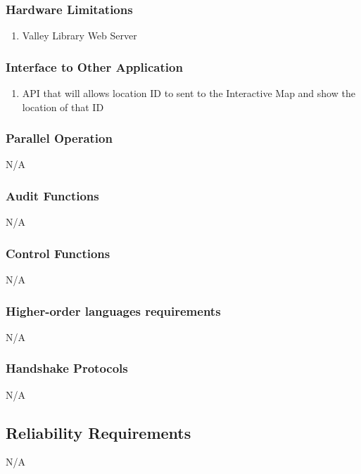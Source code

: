 \documentclass[letterpaper,10pt,titlepage]{article}
\begin{document}
\subsubsection{Hardware Limitations}
\begin{enumerate}
	\item Valley Library Web Server
\end{enumerate}

\subsubsection{Interface to Other Application}
\begin{enumerate}
	\item API that will allows location ID to sent to the Interactive Map and show the location of that ID
\end{enumerate}

\subsubsection{Parallel Operation}
N/A

\subsubsection{Audit Functions}
N/A

\subsubsection{Control Functions}
N/A

\subsubsection{Higher-order languages requirements}
N/A

\subsubsection{Handshake Protocols}
N/A

\subsection{Reliability Requirements}
N/A
\end{document}
